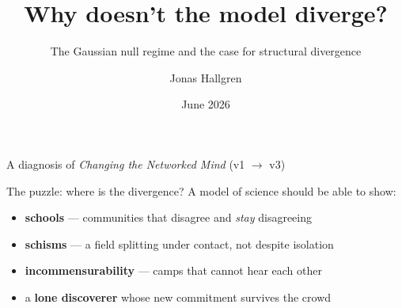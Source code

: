 \documentclass[aspectratio=169,11pt]{beamer}
\title{Why doesn't the model diverge?}
\subtitle{The Gaussian null regime and the case for structural divergence}
\author{Jonas Hallgren}
\date{June 2026}
\begin{document}
\begin{frame}
  \titlepage
  \begin{center}
    \footnotesize\color{slate}
    A diagnosis of \emph{Changing the Networked Mind} (v1 $\to$ v3)
  \end{center}
\end{frame}

\begin{frame}{The puzzle: where is the divergence?}
  A model of science should be able to show:
  \begin{itemize}
    \item<1-> \textbf{schools} --- communities that disagree and \emph{stay} disagreeing
    \item<1-> \textbf{schisms} --- a field splitting under contact, not despite isolation
    \item<1-> \textbf{incommensurability} --- camps that cannot hear each other
    \item<1-> a \textbf{lone discoverer} whose new commitment survives the crowd
  \end{itemize}
  \vspace{0.6em}
  \vspace{0.4em}
\end{frame}
\end{document}
